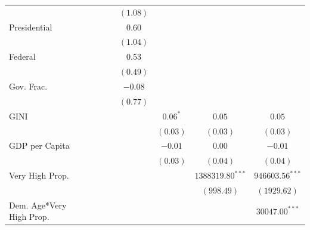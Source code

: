 \documentclass[a4paper]{article}\usepackage{graphicx, color}
\begin{document}
\begin{table}
\begin{center}
\begin{tabular}{l c c c c c c c }
                         &               &              &              & $(1.08)$      &               &                    &                   \\
Presidential             &               &              &              & $0.60$        &               &                    &                   \\
                         &               &              &              & $(1.04)$      &               &                    &                   \\
Federal                  &               &              &              & $0.53$        &               &                    &                   \\
                         &               &              &              & $(0.49)$      &               &                    &                   \\
Gov. Frac.               &               &              &              & $-0.08$       &               &                    &                   \\
                         &               &              &              & $(0.77)$      &               &                    &                   \\
GINI                     &               &              &              &               & $0.06^{*}$    & $0.05$             & $0.05$            \\
                         &               &              &              &               & $(0.03)$      & $(0.03)$           & $(0.03)$          \\
GDP per Capita           &               &              &              &               & $-0.01$       & $0.00$             & $-0.01$           \\
                         &               &              &              &               & $(0.03)$      & $(0.04)$           & $(0.04)$          \\
Very High Prop.          &               &              &              &               &               & $1388319.80^{***}$ & $946603.56^{***}$ \\
                         &               &              &              &               &               & $(998.49)$         & $(1929.62)$       \\
Dem. Age*Very High Prop. &               &              &              &               &               &                    & $30047.00^{***}$  \\

\end{tabular}
\end{center}
\end{table}
\end{document}

